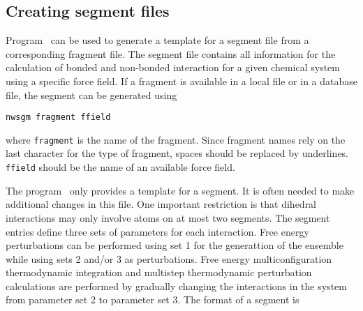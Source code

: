 \subsection{Creating segment files}
\label{nwsgm}
Program \nwsgm\ can be used to generate a template for a segment file 
from a corresponding fragment file. The segment file contains all
information for the calculation of bonded and non-bonded interaction
for a given chemical system using a specific force field. If a
fragment is available in a local file or in a database file, the
segment can be generated using
\begin{verbatim}
nwsgm fragment ffield
\end{verbatim}
where \verb+fragment+ is the name of the fragment. Since fragment
names rely on the last character for the type of fragment, spaces
should be replaced by underlines. \verb+ffield+ should be the
name of an available force field.
\par
The program \nwsgm\ only provides a template for a segment. It is
often needed to make additional changes in this file. One important 
restriction is that dihedral interactions may only involve atoms on 
at most two segments. The segment entries define three sets of
parameters for each interaction. Free energy perturbations can be
performed using set 1 for the generattion of the ensemble while using
sets 2 and/or 3 as perturbations. Free energy multiconfiguration 
thermodynamic integration and multistep thermodynamic perturbation
calculations are performed by gradually changing the interactions in
the system from parameter set 2 to parameter set 3.
The format of a segment is
